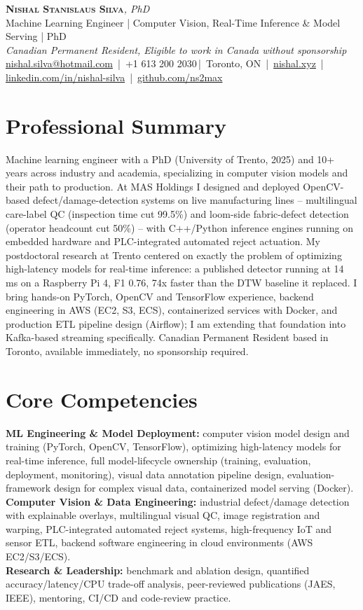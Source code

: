 \documentclass[11pt]{article}
\makeatletter
\newcommand{\cvName}{Nishal Stanislaus Silva}
\newcommand{\cvEmail}{nishal.silva@hotmail.com}
\newcommand{\cvPhone}{+1 613 200 2030}
\newcommand{\cvCity}{Toronto, ON}
\newcommand{\cvSite}{https://nishal.xyz}
\newcommand{\cvLinkedIn}{https://www.linkedin.com/in/nishal-silva}
\newcommand{\cvGitHub}{https://github.com/ns2max}
\newcommand{\cvStatus}{Canadian Permanent Resident, Eligible to work in Canada without sponsorship}
\newcommand{\cvTagline}{Machine Learning Engineer | Computer Vision, Real-Time Inference \& Model Serving | PhD}
\makeatother
\begin{document}
\pagestyle{empty}
\begin{center}
    {\LARGE \scshape \textbf{\cvName}}{\large \textit{, PhD}}\\[1pt]
    {\small \cvTagline}\\[1pt]
    {\footnotesize\textit{\cvStatus}}\\[1pt]
    {\small
    \href{mailto:\cvEmail}{\cvEmail} \,|\, \cvPhone \,|\, \cvCity
    \,|\, \href{\cvSite}{nishal.xyz} \,|\, \href{\cvLinkedIn}{linkedin.com/in/nishal-silva}
    \,|\, \href{\cvGitHub}{github.com/ns2max}}
\end{center}

\section*{Professional Summary}
Machine learning engineer with a PhD (University of Trento, 2025) and 10+ years across industry and academia, specializing in computer vision models and their path to production. At MAS Holdings I designed and deployed OpenCV-based defect/damage-detection systems on live manufacturing lines -- multilingual care-label QC (inspection time cut 99.5\%) and loom-side fabric-defect detection (operator headcount cut 50\%) -- with C++/Python inference engines running on embedded hardware and PLC-integrated automated reject actuation. My postdoctoral research at Trento centered on exactly the problem of optimizing high-latency models for real-time inference: a published detector running at 14 ms on a Raspberry Pi 4, F1 0.76, 74x faster than the DTW baseline it replaced. I bring hands-on PyTorch, OpenCV and TensorFlow experience, backend engineering in AWS (EC2, S3, ECS), containerized services with Docker, and production ETL pipeline design (Airflow); I am extending that foundation into Kafka-based streaming specifically. Canadian Permanent Resident based in Toronto, available immediately, no sponsorship required.

\section*{Core Competencies}
\textbf{ML Engineering \& Model Deployment:} computer vision model design and training (PyTorch, OpenCV, TensorFlow), optimizing high-latency models for real-time inference, full model-lifecycle ownership (training, evaluation, deployment, monitoring), visual data annotation pipeline design, evaluation-framework design for complex visual data, containerized model serving (Docker). \\[2pt]
\textbf{Computer Vision \& Data Engineering:} industrial defect/damage detection with explainable overlays, multilingual visual QC, image registration and warping, PLC-integrated automated reject systems, high-frequency IoT and sensor ETL, backend software engineering in cloud environments (AWS EC2/S3/ECS). \\[2pt]
\textbf{Research \& Leadership:} benchmark and ablation design, quantified accuracy/latency/CPU trade-off analysis, peer-reviewed publications (JAES, IEEE), mentoring, CI/CD and code-review practice.
\end{document}
